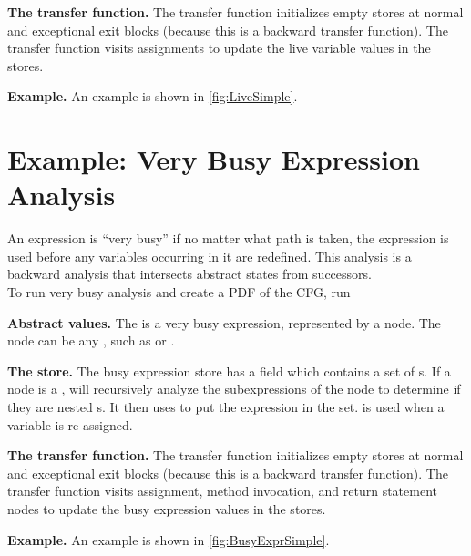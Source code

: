 \textbf{The transfer function.} The transfer function 
initializes empty stores at normal and exceptional exit blocks (because this
is a backward transfer function). The transfer function visits assignments to
update the live variable values in the stores.

\textbf{Example.} An example is shown in \autoref{fig:LiveSimple}.


\section{Example: Very Busy Expression Analysis}

An expression is ``very busy'' if no matter what path is taken,
the expression is used before any variables occurring in it are redefined.
This analysis is a backward analysis that intersects abstract states from successors.
\\
To run very busy analysis and create a PDF of the CFG, run \\

\textbf{Abstract values.} The  is a very busy expression, represented by a node.
The node can be any , such as 
or .

\textbf{The store.} The busy expression store  has a field
 which contains a set of s.
If a node is a , 
will recursively analyze the subexpressions of the node to determine
if they are nested s. It then uses 
to put the expression in the set.  is used when a variable is re-assigned.

\textbf{The transfer function.} The transfer function 
initializes empty stores at normal and exceptional exit blocks (because this
is a backward transfer function). The transfer function visits assignment, method invocation,
and return statement nodes to update the busy expression values in the stores.

\textbf{Example.} An example is shown in \autoref{fig:BusyExprSimple}.

